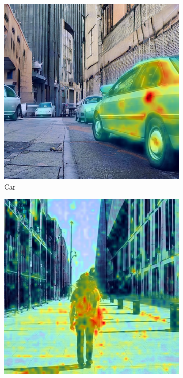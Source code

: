 \begin{figure}
\centering
  \begin{subfigure}{0.24\columnwidth}
   \includegraphics[width=\columnwidth]{img/4-experiments/dataset_example_daam_heatmap_car.png}
   \caption{Car}
   \label{subfig:dataset-example-car-daam}
  \end{subfigure}
  \begin{subfigure}{0.24\columnwidth}
   \includegraphics[width=\columnwidth]{img/4-experiments/dataset_example_daam_heatmap_person.png}

\end{subfigure}
\end{figure}

